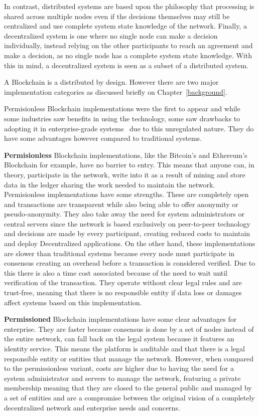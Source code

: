 In contrast, distributed systems are based upon the philosophy that processing
is shared across multiple nodes even if the decisions themselves may still be
centralized and use complete system state knowledge of the network. Finally, a
decentralized system is one where no single node can make a decision
individually, instead relying on the other participants to reach an agreement
and make a decision, as no single node has a complete system state knowledge.
With this in mind, a decentralized system is seen as a subset of a distributed
system.

A Blockchain is a distributed by design. However there are two major
implementation categories as discussed briefly on Chapter~\ref{background}.

Permisionless Blockchain implementations were the first to appear and while
some industries saw benefits in using the technology, some saw drawbacks to
adopting it in enterprise-grade systems~\cite{Gopinath2016} due to this
unregulated nature. They do have some advantages however compared to
traditional systems.

\textbf{Permisionless} Blockchain implementations, like the Bitcoin's and
Ethereum's Blockchain for example, have no barrier to entry. This means that
anyone can, in theory, participate in the network, write into it as a result of
mining and store data in the ledger sharing the work needed to maintain the
network.  Permisionless implementations have some strengths. These are
completely open and transactions are transparent while also being able to offer
anonymity or pseudo-anonymity. They also take away the need for system
administrators or central servers since the network is based exclusively on
peer-to-peer technology and decisions are made by every participant, creating
reduced costs to maintain and deploy Decentralized applications. On the other
hand, these implementations are slower than traditional systems because every
node must participate in consensus creating an overhead before a transaction is
considered verified. Due to this there is also a time cost associated because
of the need to wait until verification of the transaction. They operate without
clear legal rules and are trust-free, meaning that there is no responsible
entity if data loss or damages affect systems based on this implementation.

\textbf{Permissioned} Blockchain implementations have some clear advantages for
enterprise. They are faster because consensus is done by a set of nodes instead
of the entire network, can fall back on the legal system because it features an
identity service. This means the platform is auditable and that there is a
legal responsible entity or entities that manage the network. However, when
compared to the permissionless variant, costs are higher due to having the need
for a system administrator and servers to manage the network, featuring a
private membership meaning that they are closed to the general public and
managed by a set of entities and are a compromise between the original vision
of a completely decentralized network and enterprise needs and concerns. 

